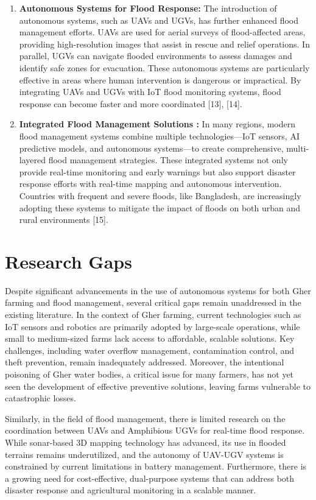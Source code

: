 \documentclass[conference]{IEEEtran}
\begin{document}
\begin{enumerate}
\item \textbf{Autonomous Systems for Flood Response: }
The introduction of autonomous systems, such as UAVs and UGVs, has further enhanced flood management efforts. UAVs are used for aerial surveys of flood-affected areas, providing high-resolution images that assist in rescue and relief operations. In parallel, UGVs can navigate flooded environments to assess damages and identify safe zones for evacuation. These autonomous systems are particularly effective in areas where human intervention is dangerous or impractical. By integrating UAVs and UGVs with IoT flood monitoring systems, flood response can become faster and more coordinated [13], [14].

\item \textbf{Integrated Flood Management Solutions : }
In many regions, modern flood management systems combine multiple technologies—IoT sensors, AI predictive models, and autonomous systems—to create comprehensive, multi-layered flood management strategies. These integrated systems not only provide real-time monitoring and early warnings but also support disaster response efforts with real-time mapping and autonomous intervention. Countries with frequent and severe floods, like Bangladesh, are increasingly adopting these systems to mitigate the impact of floods on both urban and rural environments [15].

\end{enumerate}



\section{\textbf{Research Gaps}}
Despite significant advancements in the use of autonomous systems for both Gher farming and flood management, several critical gaps remain unaddressed in the existing literature. In the context of Gher farming, current technologies such as IoT sensors and robotics are primarily adopted by large-scale operations, while small to medium-sized farms lack access to affordable, scalable solutions. Key challenges, including water overflow management, contamination control, and theft prevention, remain inadequately addressed. Moreover, the intentional poisoning of Gher water bodies, a critical issue for many farmers, has not yet seen the development of effective preventive solutions, leaving farms vulnerable to catastrophic losses.

Similarly, in the field of flood management, there is limited research on the coordination between UAVs and Amphibious UGVs for real-time flood response. While sonar-based 3D mapping technology has advanced, its use in flooded terrains remains underutilized, and the autonomy of UAV-UGV systems is constrained by current limitations in battery management. Furthermore, there is a growing need for cost-effective, dual-purpose systems that can address both disaster response and agricultural monitoring in a scalable manner.
\end{document}
